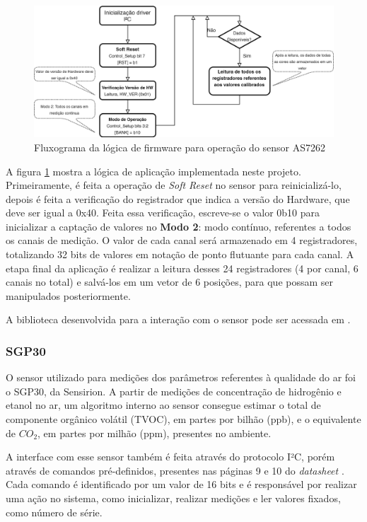 \documentclass[../monografia.tex]{subfiles}
\begin{document}
\begin{figure}[h]
	\centering
	\includegraphics[scale=0.2]{as7262_firmware.png}
	\caption{Fluxograma da lógica de firmware para operação do sensor AS7262}
	\label{fig:as7262_firmware}
\end{figure}

A figura \ref{fig:as7262_firmware} mostra a lógica de aplicação implementada neste projeto. Primeiramente, é feita a operação de \textit{Soft Reset} no sensor para reinicializá-lo, depois é feita a verificação do registrador que indica a versão do Hardware, que deve ser igual a 0x40. Feita essa verificação, escreve-se o valor 0b10 para inicializar a captação de valores no \textbf{Modo 2}: modo contínuo, referentes a todos os canais de medição. O valor de cada canal será armazenado em 4 registradores, totalizando 32 bits de valores em notação de ponto flutuante para cada canal. A etapa final da aplicação é realizar a leitura desses 24 registradores (4 por canal, 6 canais no total) e salvá-los em um vetor de 6 posições, para que possam ser manipulados posteriormente.

A biblioteca desenvolvida para a interação com o sensor pode ser acessada em \cite{as7262-lib}.



\subsubsection{SGP30}

O sensor utilizado para medições dos parâmetros referentes à qualidade do ar foi o SGP30, da Sensirion. A partir de medições de concentração de hidrogênio e etanol no ar, um algoritmo interno ao sensor consegue estimar o total de componente orgânico volátil (TVOC), em partes por bilhão (ppb), e o equivalente de $CO_{2}$, em partes por milhão (ppm), presentes no ambiente. 

A interface com esse sensor também é feita através do protocolo I²C, porém através de comandos pré-definidos, presentes nas páginas 9 e 10 do \textit{datasheet} \cite{sgp30}. Cada comando é identificado por um valor de 16 bits e é responsável por realizar uma ação no sistema, como inicializar, realizar medições e ler valores fixados, como número de série. 
\end{document}
